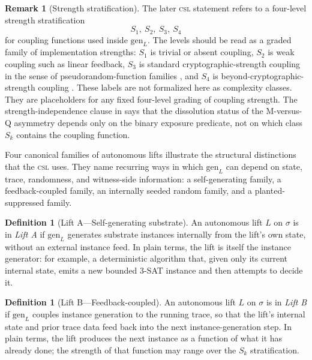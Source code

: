 \documentclass[11pt]{article}
\newcommand{\CSL}{\textsc{csl}}            \newcommand{\CSLcore}{Candidate Structural Law}
\newcommand{\Substrate}{\sigma}             \newcommand{\Lift}{L}                       \newcommand{\LiftState}{\sigma_{L}}         \newcommand{\HistorySpace}{H_{\Substrate}^{\Lift}}
\newcommand{\StrengthClass}[1]{S_{#1}}
\theoremstyle{definition}
\newtheorem{definition}[theorem]{Definition}
\newtheorem{remark}[theorem]{Remark}
\begin{document}
\begin{remark}[Strength stratification]
The later \CSL{} statement refers to a four-level strength
stratification
\[
  \StrengthClass{1},\ \StrengthClass{2},\ \StrengthClass{3},\
  \StrengthClass{4}
\]
for coupling functions used inside \(\mathrm{gen}_{\Lift}\).  The
levels should be read as a graded family of implementation strengths:
\(\StrengthClass{1}\) is trivial or absent coupling,
\(\StrengthClass{2}\) is weak coupling such as linear feedback,
\(\StrengthClass{3}\) is standard cryptographic-strength coupling in
the sense of pseudorandom-function families
\citep{GoldreichGoldwasserMicali1986RandomFunctions,Goldreich2001FoundationsCryptography},
and \(\StrengthClass{4}\) is beyond-cryptographic-strength coupling
\citep{HastadImpagliazzoLevinLuby1999PRG}.
These labels are not formalized here as complexity classes.  They are
placeholders for any fixed four-level grading of coupling strength.
The strength-independence clause in \Cref{sec:csl-core} says that the
dissolution status of the M-versus-Q asymmetry depends only on the
binary exposure predicate, not on which class
\(\StrengthClass{k}\) contains the coupling function.
\end{remark}

Four canonical families of autonomous lifts illustrate the structural
distinctions that the \CSL{} uses.  They name recurring ways in which
\(\mathrm{gen}_{\Lift}\) can depend on state, trace, randomness, and
witness-side information: a self-generating family, a feedback-coupled
family, an internally seeded random family, and a planted-suppressed
family.

\begin{definition}[Lift A---Self-generating substrate]
\label{def:lift-family-A}
An autonomous lift \(\Lift\) on \(\Substrate\) is in \emph{Lift A} if
\(\mathrm{gen}_{\Lift}\) generates substrate instances internally from
the lift's own state, without an external instance feed.  In plain
terms, the lift is itself the instance generator: for example, a
deterministic algorithm that, given only its current internal state,
emits a new bounded 3-SAT instance \citep{Cook1971TheoremProving} and
then attempts to decide it.
\end{definition}

\begin{definition}[Lift B---Feedback-coupled]
\label{def:lift-family-B}
An autonomous lift \(\Lift\) on \(\Substrate\) is in \emph{Lift B} if
\(\mathrm{gen}_{\Lift}\) couples instance generation to the running
trace, so that the lift's internal state and prior trace data feed
back into the next instance-generation step.  In plain terms, the
lift produces the next instance as a function of what it has already
done; the strength of that function may range over the
\(\StrengthClass{k}\) stratification.
\end{definition}
\end{document}
